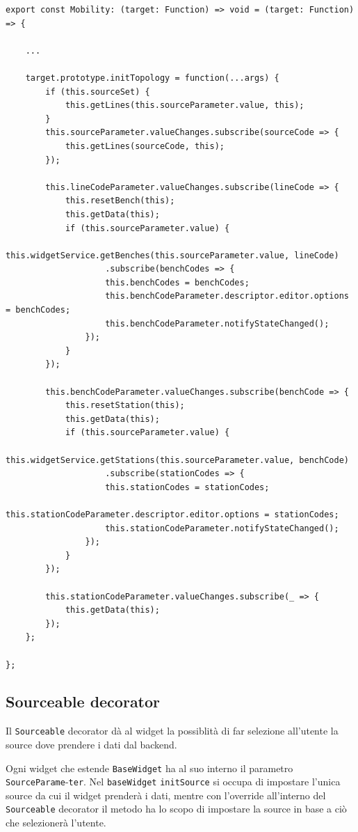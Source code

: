 \begin{lstlisting}[caption={Metodo initTopology all'interno del decorator Mobility}, style=javaScriptCode]
export const Mobility: (target: Function) => void = (target: Function) => {

    ...

    target.prototype.initTopology = function(...args) {
        if (this.sourceSet) {
            this.getLines(this.sourceParameter.value, this);
        }
        this.sourceParameter.valueChanges.subscribe(sourceCode => {
            this.getLines(sourceCode, this);
        });

        this.lineCodeParameter.valueChanges.subscribe(lineCode => {
            this.resetBench(this);
            this.getData(this);
            if (this.sourceParameter.value) {
                this.widgetService.getBenches(this.sourceParameter.value, lineCode)
                    .subscribe(benchCodes => {
                    this.benchCodes = benchCodes;
                    this.benchCodeParameter.descriptor.editor.options = benchCodes;
                    this.benchCodeParameter.notifyStateChanged();
                });
            }
        });

        this.benchCodeParameter.valueChanges.subscribe(benchCode => {
            this.resetStation(this);
            this.getData(this);
            if (this.sourceParameter.value) {
                this.widgetService.getStations(this.sourceParameter.value, benchCode)
                    .subscribe(stationCodes => {
                    this.stationCodes = stationCodes;
                    this.stationCodeParameter.descriptor.editor.options = stationCodes;
                    this.stationCodeParameter.notifyStateChanged();
                });
            }
        });

        this.stationCodeParameter.valueChanges.subscribe(_ => {
            this.getData(this);
        });
    };

};
\end{lstlisting}

\subsection{Sourceable decorator}
Il \verb|Sourceable| decorator dà al widget la possiblità di far selezione all'utente la source dove prendere i dati dal backend.

Ogni widget che estende \verb|BaseWidget| ha al suo interno il parametro \verb|SourceParame|-\verb|ter|. Nel \verb|baseWidget| \verb|initSource| si occupa di impostare l'unica source da cui il widget prenderà i dati, mentre con l'override all'interno del \verb|Sourceable| decorator il metodo ha lo scopo di impostare la source in base a ciò che selezionerà l'utente.


